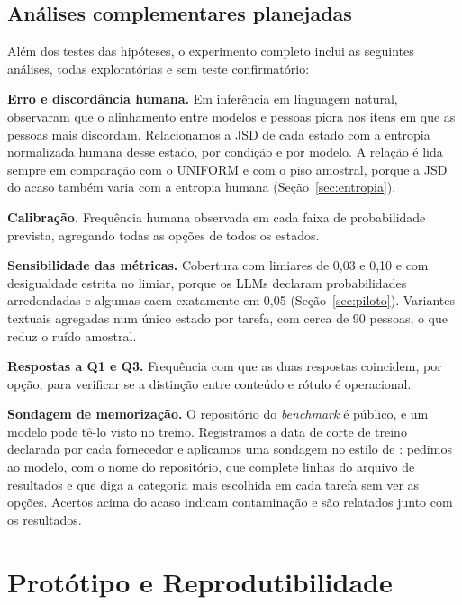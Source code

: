 \documentclass[12pt,oneside,a4paper,chapter=TITLE,english,brazil]{abntex2}
\begin{document}
\subsection{Análises complementares planejadas}
\label{sec:complementares}

\begin{planejado}
Além dos testes das hipóteses, o experimento completo inclui as seguintes análises, todas exploratórias e sem teste confirmatório:

\textbf{Erro e discordância humana.} Em inferência em linguagem natural,  observaram que o alinhamento entre modelos e pessoas piora nos itens em que as pessoas mais discordam. Relacionamos a JSD de cada estado com a entropia normalizada humana desse estado, por condição e por modelo. A relação é lida sempre em comparação com o UNIFORM e com o piso amostral, porque a JSD do acaso também varia com a entropia humana (Seção~\ref{sec:entropia}).

\textbf{Calibração.} Frequência humana observada em cada faixa de probabilidade prevista, agregando todas as opções de todos os estados.

\textbf{Sensibilidade das métricas.} Cobertura com limiares de 0,03 e 0,10 e com desigualdade estrita no limiar, porque os LLMs declaram probabilidades arredondadas e algumas caem exatamente em 0,05 (Seção~\ref{sec:piloto}). Variantes textuais agregadas num único estado por tarefa, com cerca de 90 pessoas, o que reduz o ruído amostral.

\textbf{Respostas a Q1 e Q3.} Frequência com que as duas respostas coincidem, por opção, para verificar se a distinção entre conteúdo e rótulo é operacional.

\textbf{Sondagem de memorização.} O repositório do \textit{benchmark} é público, e um modelo pode tê-lo visto no treino. Registramos a data de corte de treino declarada por cada fornecedor e aplicamos uma sondagem no estilo de : pedimos ao modelo, com o nome do repositório, que complete linhas do arquivo de resultados e que diga a categoria mais escolhida em cada tarefa sem ver as opções. Acertos acima do acaso indicam contaminação e são relatados junto com os resultados.
\end{planejado}

\section{Protótipo e Reprodutibilidade}
\label{sec:arquitetura}
\end{document}
